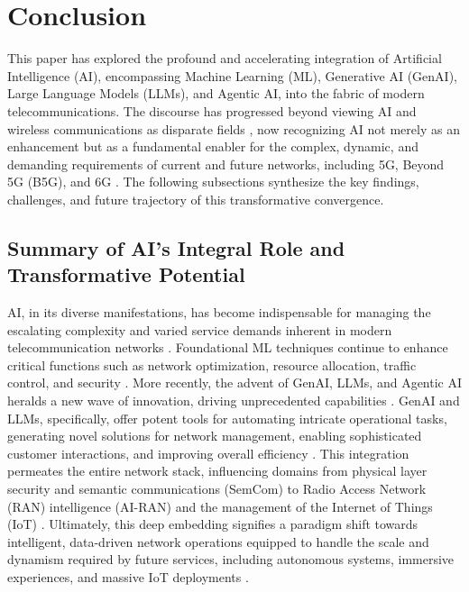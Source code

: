 \documentclass[sigconf]{acmart}
\begin{document}
\section{Conclusion}
\label{sec:conclusion}

This paper has explored the profound and accelerating integration of Artificial Intelligence (AI), encompassing Machine Learning (ML), Generative AI (GenAI), Large Language Models (LLMs), and Agentic AI, into the fabric of modern telecommunications. The discourse has progressed beyond viewing AI and wireless communications as disparate fields \cite{ref1}, now recognizing AI not merely as an enhancement but as a fundamental enabler for the complex, dynamic, and demanding requirements of current and future networks, including 5G, Beyond 5G (B5G), and 6G \cite{ref1, ref6, ref12, ref17, ref28}. The following subsections synthesize the key findings, challenges, and future trajectory of this transformative convergence.

\subsection{Summary of AI's Integral Role and Transformative Potential}
\label{subsec:summary_role}

AI, in its diverse manifestations, has become indispensable for managing the escalating complexity and varied service demands inherent in modern telecommunication networks \cite{ref1, ref3, ref5, ref11, ref12, ref28}. Foundational ML techniques continue to enhance critical functions such as network optimization, resource allocation, traffic control, and security \cite{ref1, ref5, ref11, ref12, ref30}. More recently, the advent of GenAI, LLMs, and Agentic AI heralds a new wave of innovation, driving unprecedented capabilities \cite{ref2, ref4, ref8, ref9, ref16, ref18, ref19, ref20, ref21, ref22, ref23, ref24, ref25, ref26, ref29, ref31, ref32, ref33, ref34, ref35}. GenAI and LLMs, specifically, offer potent tools for automating intricate operational tasks, generating novel solutions for network management, enabling sophisticated customer interactions, and improving overall efficiency \cite{ref2, ref4, ref8, ref9, ref19, ref26, ref32}. This integration permeates the entire network stack, influencing domains from physical layer security \cite{ref5, ref16} and semantic communications (SemCom) \cite{ref24, ref34} to Radio Access Network (RAN) intelligence (AI-RAN) \cite{ref25} and the management of the Internet of Things (IoT) \cite{ref22, ref29}. Ultimately, this deep embedding signifies a paradigm shift towards intelligent, data-driven network operations equipped to handle the scale and dynamism required by future services, including autonomous systems, immersive experiences, and massive IoT deployments \cite{ref1, ref17}.
\end{document}
